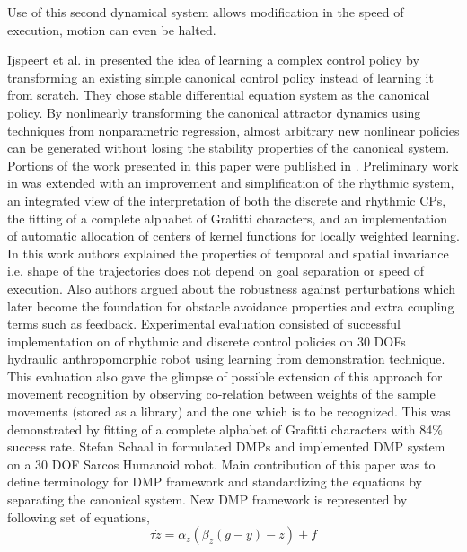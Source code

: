 Use of this second dynamical system allows modification in the speed of execution, motion can even be halted. 


Ijspeert et al. in \cite{ijspeert2003learning} presented the idea of learning a complex control policy by transforming
an existing simple canonical control policy instead of learning it from scratch. They chose stable differential equation system as the canonical policy. By nonlinearly transforming the canonical attractor dynamics using techniques from nonparametric regression, almost arbitrary new nonlinear policies can be generated without losing the stability properties of the canonical system. Portions of the work presented in this paper were published in \cite{ijspeert2002movement}. Preliminary work in \cite{ijspeert2002movement} was extended with an improvement and simplification of the rhythmic system, an integrated view of the interpretation of both the discrete and rhythmic CPs, the fitting of a complete alphabet of Grafitti characters, and an implementation of automatic allocation of centers of kernel functions for locally weighted learning. In this work authors explained the properties of temporal and spatial invariance i.e. shape of the trajectories does not depend on goal separation or speed of execution. Also authors argued about the robustness against perturbations which later become the foundation for obstacle avoidance properties and extra coupling terms such as feedback.
Experimental evaluation consisted of successful implementation on of rhythmic and discrete control policies on 30 DOFs hydraulic anthropomorphic robot using learning from demonstration technique. This evaluation also gave the glimpse of possible extension of this approach for movement recognition by observing co-relation between weights of the sample movements (stored as a library) and the one which is to be recognized. This was demonstrated by fitting of a complete alphabet of Grafitti characters with 84\% success rate. 
\newline
Stefan Schaal in \cite{schaal2006dynamic} formulated DMPs and implemented DMP system on a 30 DOF Sarcos Humanoid robot. Main contribution of this paper was to define terminology for DMP framework and standardizing the equations by separating the canonical system. 
New DMP framework is represented by following set of equations,  
\begin{equation}
\tau\dot{z} = \alpha_{z}(\beta_{z}(g - y) - z) + f
\end{equation}
